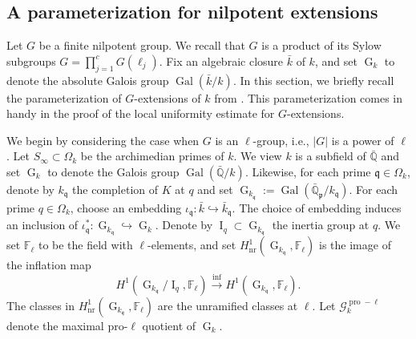 \documentclass[11pt]{amsart}
\newcommand{\fq}{\mathfrak{q}}
\newcommand{\Q}{\mathbb{Q}}
\newcommand{\F}{\mathbb{F}}
\newcommand{\fp}{\mathfrak{p}}
\newcommand{\op}[1]{\operatorname{#1}}
\numberwithin{equation}{section}
\begin{document}
\subsection{A parameterization for nilpotent extensions} Let $G$ be a finite nilpotent group. We recall that $G$ is a product of its Sylow subgroups $G=\prod_{j=1}^c G(\ell_j)$. Fix an algebraic closure $\bar{k}$ of $k$, and set $\op{G}_k$ to denote the absolute Galois group $\op{Gal}(\bar{k}/k)$. In this section, we briefly recall the parameterization of $G$-extensions of $k$ from \cite[section 2]{koymanspagano2023}. This parameterization comes in handy in the proof of the local uniformity estimate for $G$-extensions.


\par We begin by considering the case when $G$ is an $\ell$-group, i.e., $|G|$ is a power of $\ell$. Let $S_\infty\subset \Omega_k$ be the archimedian primes of $k$. We view $k$ is a subfield of $\bar{\Q}$ and set $\op{G}_k$ to denote the Galois group $\op{Gal}(\bar{\Q}/k)$. Likewise, for each prime $\fq\in \Omega_k$, denote by $k_{\fq}$ the completion of $K$ at $q$ and set $\op{G}_{k_{\fq}}:=\op{Gal}(\bar{\Q}_{\fp}/k_{\fq})$. For each prime $q\in \Omega_k$, choose an embedding $\iota_{\fq}: \bar{k}\hookrightarrow \bar{k}_\fq$. The choice of embedding induces an inclusion of $\iota_{\fq}^\ast: \op{G}_{k_{\fq}}\hookrightarrow \op{G}_k$. Denote by $\op{I}_{q}\subset \op{G}_{k_{\fq}}$ the inertia group at $q$. We set $\F_\ell$ to be the field with $\ell$-elements, and set $H^1_{\op{nr}}(\op{G}_{k_{\fq}}, \F_\ell)$ is the image of the inflation map
\[H^1(\op{G}_{k_{\fq}}/\op{I}_{q}, \F_\ell)\xrightarrow{\op{inf}} H^1(\op{G}_{k_{\fq}}, \F_\ell).\]
The classes in $H^1_{\op{nr}}(\op{G}_{k_{\fq}}, \F_\ell)$ are the unramified classes at $\ell$. Let $\mathcal{G}_k^{\op{pro}-\ell}$ denote the maximal pro-$\ell$ quotient of $\op{G}_k$. 
\end{document}
